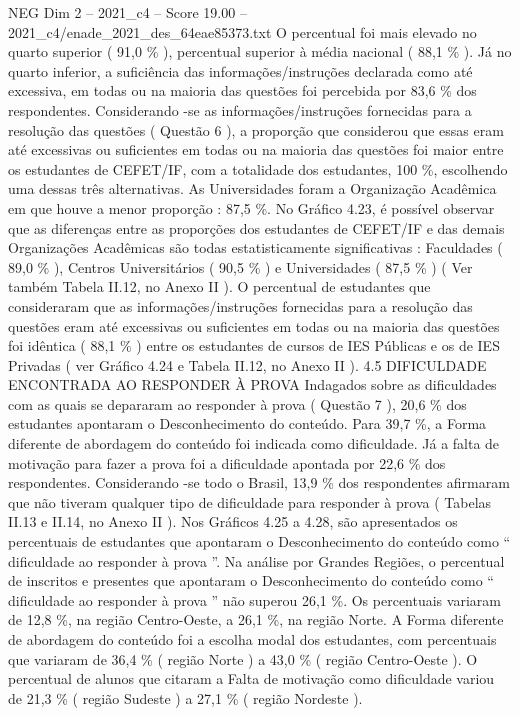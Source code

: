 \begin{textsample}{NEG Dim 2 – 2021\_c4 – Score 19.00 – 2021\_c4/enade\_2021\_des\_64eae85373.txt}
O percentual foi mais elevado no quarto superior ( 91,0 \% ), percentual superior à média nacional ( 88,1 \% ).
Já no quarto inferior, a suficiência das informações/instruções declarada como até excessiva, em todas ou na maioria das questões foi percebida por 83,6 \% dos respondentes.
Considerando -se as informações/instruções fornecidas para a resolução das questões ( Questão 6 ), a proporção que considerou que essas eram até excessivas ou suficientes em todas ou na maioria das questões foi maior entre os estudantes de CEFET/IF, com a totalidade dos estudantes, 100 \%, escolhendo uma dessas três alternativas.
As Universidades foram a Organização Acadêmica em que houve a menor proporção : 87,5 \%.
No Gráfico 4.23, é possível observar que as diferenças entre as proporções dos estudantes de CEFET/IF e das demais Organizações Acadêmicas são todas estatisticamente significativas : Faculdades ( 89,0 \% ), Centros Universitários ( 90,5 \% ) e Universidades ( 87,5 \% ) ( Ver também Tabela II.12, no Anexo II ).
O percentual de estudantes que consideraram que as informações/instruções fornecidas para a resolução das questões eram até excessivas ou suficientes em todas ou na maioria das questões foi idêntica ( 88,1 \% ) entre os estudantes de cursos de IES Públicas e os de IES Privadas ( ver Gráfico 4.24 e Tabela II.12, no Anexo II ). 4.5 DIFICULDADE ENCONTRADA AO RESPONDER À PROVA Indagados sobre as dificuldades com as quais se depararam ao responder à prova ( Questão 7 ), 20,6 \% dos estudantes apontaram o Desconhecimento do conteúdo.
Para 39,7 \%, a Forma diferente de abordagem do conteúdo foi indicada como dificuldade.
Já a falta de motivação para fazer a prova foi a dificuldade apontada por 22,6 \% dos respondentes.
Considerando -se todo o Brasil, 13,9 \% dos respondentes afirmaram que não tiveram qualquer tipo de dificuldade para responder à prova ( Tabelas II.13 e II.14, no Anexo II ).
Nos Gráficos 4.25 a 4.28, são apresentados os percentuais de estudantes que apontaram o Desconhecimento do conteúdo como “ dificuldade ao responder à prova ”.
Na análise por Grandes Regiões, o percentual de inscritos e presentes que apontaram o Desconhecimento do conteúdo como “ dificuldade ao responder à prova ” não superou 26,1 \%.
Os percentuais variaram de 12,8 \%, na região Centro-Oeste, a 26,1 \%, na região Norte.
A Forma diferente de abordagem do conteúdo foi a escolha modal dos estudantes, com percentuais que variaram de 36,4 \% ( região Norte ) a 43,0 \% ( região Centro-Oeste ).
O percentual de alunos que citaram a Falta de motivação como dificuldade variou de 21,3 \% ( região Sudeste ) a 27,1 \% ( região Nordeste ).

\end{textsample}
